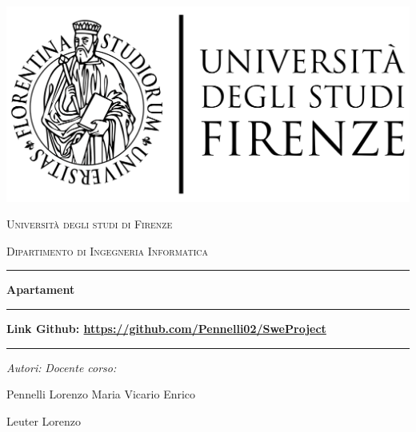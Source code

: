 \documentclass[10pt]{article}
\begin{document}
\par\medskip
\begin{center}
\includegraphics[scale=0.1,center]{unifilogo/firenze2}
\end{center}

\begin{center}
\par\medskip
\textsc{{\large Università degli studi di Firenze}}\\
\par\medskip
\textsc{{\normalsize Dipartimento di Ingegneria Informatica}}\\
\par\medskip
\par\medskip
\hrule width 12cm height 1pt \par
\par\medskip
\par\medskip
\par\medskip
{\Huge \textbf{Apartament}}\\
\par\medskip
\par\medskip
\par\medskip
\hrule width 12cm height 1pt \par
\par\medskip
\par\medskip
{\Large \textbf{Link Github: \href{https://github.com/Pennelli02/SweProject}{https://github.com/Pennelli02/SweProject}}}
\par\medskip
\par\medskip
\hrule width 12cm height 1pt \par
\par\medskip
\par\medskip
\par\medskip
\emph{Autori:} \hfill \emph{Docente corso:}\\
\par\medskip
Pennelli Lorenzo Maria \hfill Vicario Enrico\\
\begin{FlushLeft}
Leuter Lorenzo\\
\end{FlushLeft}

\end{center}
\end{document}
